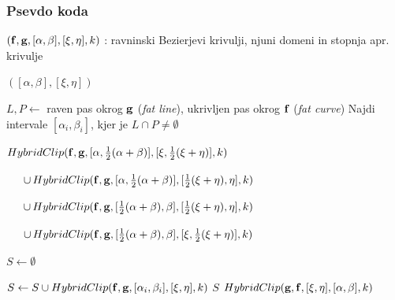 \documentclass[unknownkeysallowed]{beamer}
\begin{document}


\begin{frame}
\frametitle{Psevdo koda}

\begin{scriptsize}
   \begin{algorithmic}[1]
	\Require $({\bf f},{\bf g}, [\alpha,\beta], [\xi,\eta], k)$ : ravninski Bezierjevi krivulji, njuni domeni in stopnja apr. krivulje

		\State \Return $([\alpha,\beta],[\xi,\eta])$
	\Else
		
		\If{$|\alpha - \beta | \geq |\xi - \eta|$}
			\State $L, P \gets $ raven pas okrog ${\bf g}$ ({\em fat line}), ukrivljen pas okrog ${\bf f}$ ({\em fat curve})
			\State Najdi intervale $[\alpha _i,\beta _i]$, kjer je $L\cap P\neq \emptyset$
				\State \Return \begin{varwidth}[t]{\linewidth} 
					$HybridClip({\bf f},{\bf g},[\alpha,\frac{1}{2}(\alpha+\beta)],[\xi,\frac{1}{2}(\xi+\eta)],k)$\par$
        \hskip\algorithmicindent
					\cup \, HybridClip({\bf f},{\bf g},[\alpha,\frac{1}{2}(\alpha+\beta)],[\frac{1}{2}(\xi+\eta), \eta],k)$\par$
        \hskip\algorithmicindent
					\cup \, HybridClip({\bf f},{\bf g},[\frac{1}{2}(\alpha+\beta), \beta],[\frac{1}{2}(\xi+\eta), \eta],k)$\par$
        \hskip\algorithmicindent
					\cup \, HybridClip({\bf f},{\bf g},[\frac{1}{2}(\alpha+\beta), \beta],[\xi, \frac{1}{2}(\xi+\eta)],k)$
					\end{varwidth}
			\Else
				\State $S\gets \emptyset$

					\State $S\gets S\cup HybridClip({\bf f},{\bf g},[\alpha _i,\beta _i], [\xi,\eta],k)$
				\EndFor
				\State \Return $S$
			\EndIf
		\Else
			\State $HybridClip( {\bf g}, {\bf f}, [\xi,\eta],[\alpha,\beta],k)$
		\EndIf
	\EndIf

   \end{algorithmic}
\end{scriptsize}

\end{frame}
\end{document}
